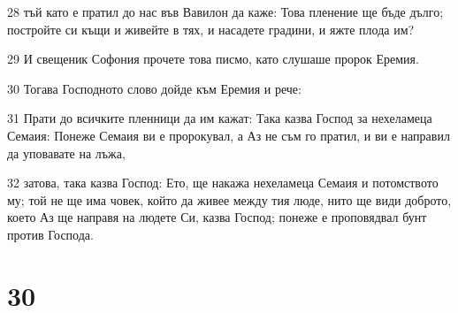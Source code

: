 \par 28 тъй като е пратил до нас във Вавилон да каже: Това пленение ще бъде дълго; постройте си къщи и живейте в тях, и насадете градини, и яжте плода им?
\par 29 И свещеник Софония прочете това писмо, като слушаше пророк Еремия.
\par 30 Тогава Господното слово дойде към Еремия и рече:
\par 31 Прати до всичките пленници да им кажат: Така казва Господ за нехеламеца Семаия: Понеже Семаия ви е пророкувал, а Аз не съм го пратил, и ви е направил да уповавате на лъжа,
\par 32 затова, така казва Господ: Ето, ще накажа нехеламеца Семаия и потомството му; той не ще има човек, който да живее между тия люде, нито ще види доброто, което Аз ще направя на людете Си, казва Господ; понеже е проповядвал бунт против Господа.

\chapter{30}

